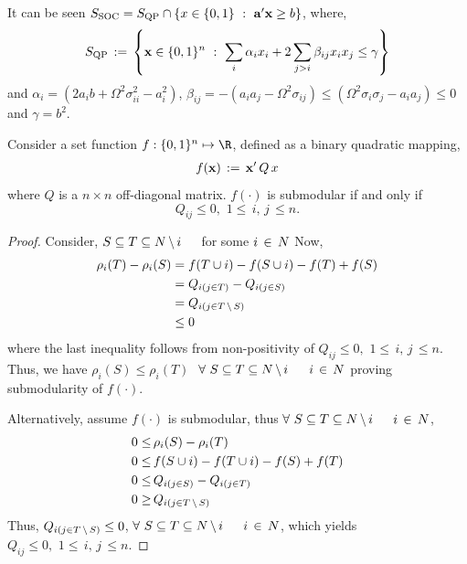\documentclass[10pt,twoside]{amsart}
\begin{document}
It can be seen $S_{\text{SOC}} = S_{\text{QP}} \cap \left\{ {x\in \{0,1\}} \ : \ {\mathbf{a}'\mathbf{x} \geq b} \right\}$, where,
$$
        S_{\text{QP}} \,:=\, \left\{ {\mathbf{x} \in \{0,1\}^n} \ : \ {\sum_i{\alpha_ix_i + 2\sum_{j>i}{\beta_{ij}x_ix_j}} \leq \gamma} \right\}
$$
and $\alpha_i = (2a_ib + \Omega^2\sigma_{ii}^2 - a_i^2)$, $\beta_{ij} = -(a_ia_j - \Omega^2\sigma_{ij}) \leq (\Omega^2\sigma_{i}\sigma_j- a_ia_j) \leq 0$ and $\gamma = b^2$.

\begin{prop}
  \label{prop:Qsubmod}
  Consider a set function $f: \binset^n\mapsto \R$, defined as a binary quadratic mapping,
  \begin{align}
    f(\mathbf{x}) \,:=\, \mathbf{x}'\,Q\,x
  \end{align}
  where $Q$ is a $n\times n$ off-diagonal matrix. $f(\cdot)$ is submodular if and only if $$Q_{ij} \leq 0,\,\, 1\leq \,i,\,j\,\leq n.$$
\end{prop}
\begin{proof}
  Consider,  $S\subseteq T \subseteq N\,\backslash\, i\,\,\,\,\,\,\,$ for some $i \,\in\, N$
  Now,
  \begin{align*}
    \rho_i(T) - \rho_i(S) & = f(T\cup i) - f(S\cup i) - f(T) + f(S)\\
                        & = Q_{i(j\in T)} - Q_{i(j\in S)}\\
                        & = Q_{i(j\in T\,\backslash\, S)}\\
                        & \leq 0
  \end{align*}
  where the last inequality follows from non-positivity of $Q_{ij} \leq 0,\,\, 1\leq \,i,\,j\,\leq n$. Thus, we have $\rho_i(S) \leq \rho_i(T)\,\,$ $\forall\,\,S\subseteq T \subseteq N\,\backslash\, i\,\,\,\,\,\,\,$ $i \,\in\, N$ proving submodularity of $f(\cdot)$.

  Alternatively, assume $f(\cdot)$ is submodular, thus $\forall\,\,S\subseteq T \subseteq N\,\backslash\, i\,\,\,\,\,\,\,$ $i \,\in\, N$,
  \begin{align*}
    0 \leq & \, \rho_i(S) - \rho_i(T)\\
    0 \leq & \, f(S\cup i) - f(T\cup i) - f(S) + f(T)\\
    0 \leq & \, Q_{i(j\in S)} - Q_{i(j\in T)}\\
    0 \geq & \, Q_{i(j\in T\,\backslash\, S)}
  \end{align*}
  Thus, $Q_{i(j\in T\,\backslash\, S)} \leq 0$, $\forall\,\,S\subseteq T \subseteq N\,\backslash\, i\,\,\,\,\,\,\,$ $i \,\in\, N$, which yields $Q_{ij} \leq 0,\,\, 1\leq \,i,\,j\,\leq n.$
\end{proof}
\end{document}
